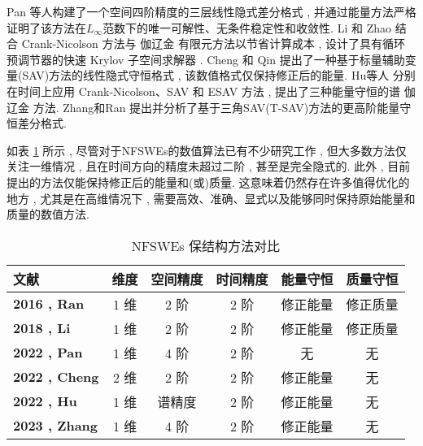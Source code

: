 Pan 等人\cite{panFourthorderDifferenceScheme2022}构建了一个空间四阶精度的三层线性隐式差分格式 , 并通过能量方法严格证明了该方法在$L_{\infty}$范数下的唯一可解性、无条件稳定性和收敛性.
Li 和 Zhao \cite{liFastEnergyConserving2018} 结合 Crank-Nicolson 方法与 伽辽金 有限元方法以节省计算成本 , 设计了具有循环预调节器的快速 Krylov 子空间求解器 . 
Cheng 和 Qin \cite{chengConvergenceEnergyconservingScheme2022} 提出了一种基于标量辅助变量(SAV)方法的线性隐式守恒格式 , 该数值格式仅保持修正后的能量.
Hu等人 \cite{huEfficientEnergyPreserving2022} 分别在时间上应用 Crank-Nicolson、SAV 和 ESAV 方法 , 提出了三种能量守恒的谱 伽辽金 方法.
Zhang和Ran \cite{zhangHighorderStructurepreservingDifference2023} 提出并分析了基于三角SAV(T-SAV)方法的更高阶能量守恒差分格式.

如表 \ref{tab:NFSWEs} 所示 , 尽管对于NFSWEs的数值算法已有不少研究工作 , 但大多数方法仅关注一维情况 , 且在时间方向的精度未超过二阶 , 甚至是完全隐式的.
此外 , 目前提出的方法仅能保持修正后的能量和(或)质量.
这意味着仍然存在许多值得优化的地方 , 尤其是在高维情况下 , 需要高效、准确、显式以及能够同时保持原始能量和质量的数值方法.
\begin{table}[htbp]
    \centering
    \small
    \caption{NFSWEs 保结构方法对比}
        \begin{tabular}{lccccc}
        \toprule
        \textcolor[rgb]{0 , 0 , 0}{\textbf{文献}} & \textcolor[rgb]{0 , 0 , 0}{\textbf{维度}} & \textcolor[rgb]{0 , 0 , 0}{\textbf{空间精度}} & \textcolor[rgb]{0 , 0 , 0}{\textbf{时间精度}} & \textcolor[rgb]{0 , 0 , 0}{\textbf{能量守恒}} & \textcolor[rgb]{0 , 0 , 0}{\textbf{质量守恒}} \\
        \midrule
        \textcolor[rgb]{0 , 0 , 0}{\textbf{\cite{ranLinearlyImplicitConservative2016}{2016 , Ran}}} & 1 维   & 2 阶   & 2 阶   & 修正能量  & 修正质量 \\
        \midrule
        \textcolor[rgb]{0 , 0 , 0}{\textbf{\cite{liFastEnergyConserving2018}{2018 , Li}}} & 1 维   & 2 阶   & 2 阶   & 修正能量  & 修正质量 \\
        \midrule
        \textcolor[rgb]{0 , 0 , 0}{\textbf{\cite{panFourthorderDifferenceScheme2022}{2022 , Pan}}} & 1 维   & 4 阶   & 2 阶   & 无     & 无 \\
        \midrule
        \textcolor[rgb]{0 , 0 , 0}{\textbf{\cite{chengConvergenceEnergyconservingScheme2022}{2022 , Cheng}}} & 2 维   & 2 阶   & 2 阶   & 修正能量  & 无 \\
        \midrule
        \textcolor[rgb]{0 , 0 , 0}{\textbf{\cite{huEfficientEnergyPreserving2022}{2022 , Hu}}} & 1 维   & 谱精度   & 2 阶   & 修正能量  & 无 \\
        \midrule
        \textcolor[rgb]{0 , 0 , 0}{\textbf{\cite{zhangHighorderStructurepreservingDifference2023}{2023 , Zhang}}} & 1 维   & 4 阶   & 2 阶   & 修正能量  & 无 \\
        \bottomrule
        \end{tabular}%
    \label{tab:NFSWEs}%
    \end{table}%
